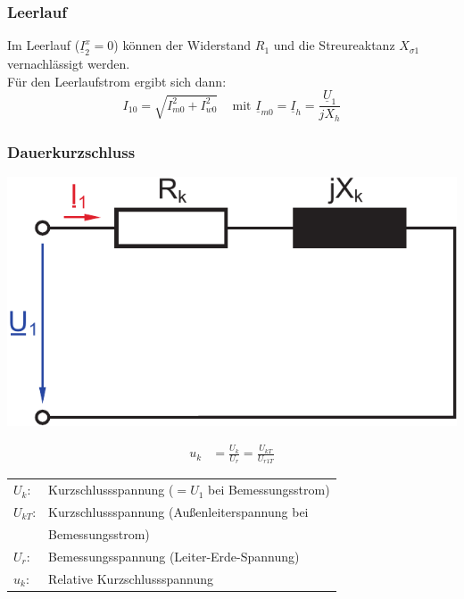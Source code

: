 \documentclass[a4paper,twocolumn,10pt]{article}
\begin{document}
\subsubsection{Leerlauf}
Im Leerlauf ($\underline{I}_2^x=0$) können der Widerstand $R_1$ und die Streureaktanz $X_{\sigma 1}$ vernachlässigt werden.\\
Für den Leerlaufstrom ergibt sich dann:
\begin{equation*}
I_{10}=\sqrt{I_{m0}^2+I_{w0}^2}\;\;\;\text{ mit }\underline{I}_{m0}=\underline{I}_h=\frac{\underline{U}_1}{jX_h}
\end{equation*}

\subsubsection{Dauerkurzschluss}
\begin{center}
\includegraphics[width=0.6\columnwidth]{Grafiken/Trafo_KS_ESB}
\end{center}
\begin{equation*}
\begin{split}
u_k&=\frac{U_k}{U_r}=\frac{U_{kT}}{U_{r1T}}
\end{split}
\end{equation*}
\begin{tabular}{ll}
$U_k$: & Kurzschlussspannung ($=U_1$ bei Bemessungsstrom)\\
$U_{kT}$: & Kurzschlussspannung (Außenleiterspannung bei\\
& Bemessungsstrom)\\
$U_r$: & Bemessungsspannung (Leiter-Erde-Spannung)\\
$u_k$: & Relative Kurzschlussspannung
\end{tabular}
\end{document}
